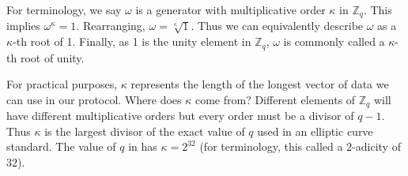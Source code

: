 For terminology, we say \(\omega\) is a generator with multiplicative order \(\kappa\) in \(\mathbb{Z}_q\). This implies \(\omega^\kappa=1\). Rearranging, \(\omega=\sqrt[\kappa]{1}\). Thus we can equivalently describe \(\omega\) as a \(\kappa\)-th root of 1. Finally, as 1 is the unity element in \(\mathbb{Z}_q\), \(\omega\) is commonly called a \(\kappa\)-th root of unity.

For practical purposes, \(\kappa\) represents the length of the longest vector of data we can use in our protocol. Where does \(\kappa\) come from? Different elements of \(\mathbb{Z}_q\) will have different multiplicative orders but every order must be a divisor of \(q-1\). Thus \(\kappa\) is the largest divisor of the exact value of \(q\) used in an elliptic curve standard. The value of $q$ in \bls has \(\kappa=2^{32}\) (for terminology, this called a \(2\)-adicity of \(32\)).

